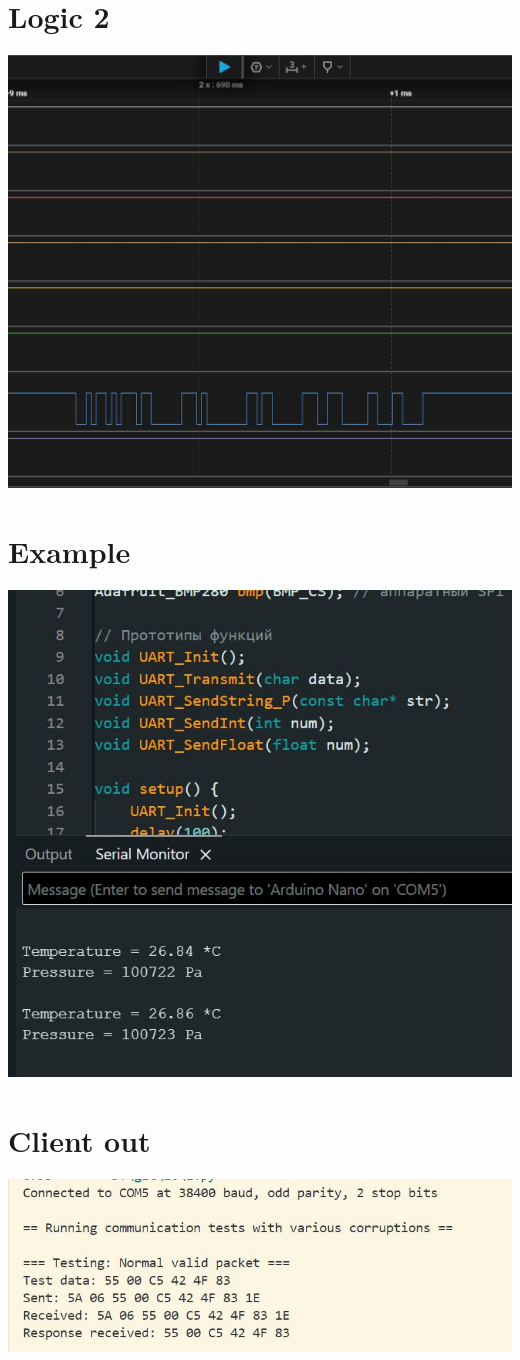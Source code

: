 \documentclass{article}
\begin{document}
\section{Logic 2}

\begin{center}
  \includegraphics[width=.9\textwidth]{any}
\end{center}

\section{Example}

\begin{center}
  \includegraphics[width=.9\textwidth]{exmpl}
\end{center}

\section{Client out}

\begin{center}
  \includegraphics[width=.9\textwidth]{image}
\end{center}
\end{document}
